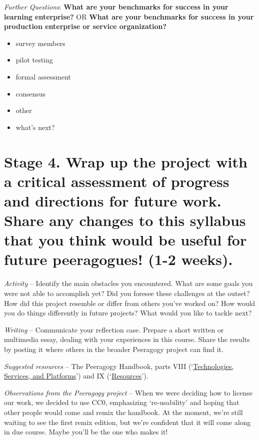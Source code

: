 \emph{Further Questions}: \textbf{What are your benchmarks for success
in your learning enterprise?} OR \textbf{What are your benchmarks for
success in your production enterprise or service organization?}

\begin{itemize}
\tightlist
\item
  survey members
\item
  pilot testing
\item
  formal assessment
\item
  consensus
\item
  other
\item
  what's next?
\end{itemize}

\hypertarget{stage-4.-wrap-up-the-project-with-a-critical-assessment-of-progress-and-directions-for-future-work.-share-any-changes-to-this-syllabus-that-you-think-would-be-useful-for-future-peeragogues-1-2-weeks.}{%
\section{Stage 4. Wrap up the project with a critical assessment of
progress and directions for future work. Share any changes to this
syllabus that you think would be useful for future peeragogues! (1-2
weeks).}\label{stage-4.-wrap-up-the-project-with-a-critical-assessment-of-progress-and-directions-for-future-work.-share-any-changes-to-this-syllabus-that-you-think-would-be-useful-for-future-peeragogues-1-2-weeks.}}

\emph{Activity} -- Identify the main obstacles you encountered. What are
some goals you were not able to accomplish yet? Did you foresee these
challenges at the outset? How did this project resemble or differ from
others you've worked on? How would you do things differently in future
projects? What would you like to tackle next?

\emph{Writing} -- Communicate your reflection case. Prepare a short
written or multimedia essay, dealing with your experiences in this
course. Share the results by posting it where others in the broader
Peeragogy project can find it.

\emph{Suggested resources} -- The Peeragogy Handbook, parts VIII
(`\href{http://peeragogy.org/resources/technologies/}{Technologies,
Services, and Platforms}') and IX
(`\href{http://peeragogy.org/resources/}{Resources}').

\emph{Observations from the Peeragogy project} -- When we were deciding
how to license our work, we decided to use CC0, emphasizing
`re-usability' and hoping that other people would come and remix the
handbook. At the moment, we're still waiting to see the first remix
edition, but we're confident that it will come along in due course.
Maybe you'll be the one who makes it!

